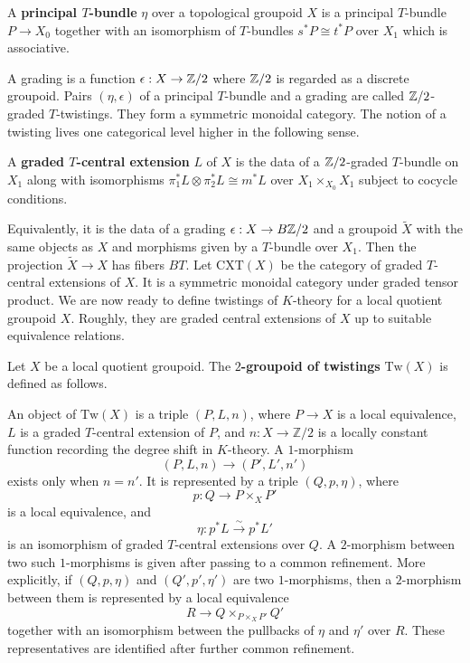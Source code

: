 \documentclass[12pt]{article}
\begin{document}
\begin{definition}
A \textbf{principal $T$-bundle} $\eta$ over a topological groupoid $X$ is a principal $T$-bundle $P\to X_0$ together with an isomorphism of $T$-bundles $s^*P \cong t^*P$ over $X_1$ which is associative.
\end{definition}

A grading is a function $\epsilon:X\to \mathbb{Z}/2$ where $\mathbb{Z}/2$ is regarded as a discrete groupoid. Pairs $(\eta,\epsilon)$ of a principal $T$-bundle and a grading are called $\mathbb{Z}/2$-graded $T$-twistings. They form a symmetric monoidal category. The notion of a twisting lives one categorical level higher in the following sense.

\begin{definition}
    A \textbf{graded $T$-central extension} $L$ of $X$ is the data of a $\mathbb{Z}/2$-graded $T$-bundle on $X_1$ along with isomorphisms $\pi_1^*L \otimes \pi_2^*L \cong m^*L$ over $X_1\times_{X_0} X_1$ subject to cocycle conditions. 
\end{definition}

Equivalently, it is the data of a grading $\epsilon:X\to B\mathbb{Z}/2$ and a groupoid $\widetilde{X}$ with the same objects as $X$ and morphisms given by a $T$-bundle over $X_1$. Then the projection $\widetilde{X}\to X$ has fibers $BT$. Let $\mathrm{CXT}(X)$ be the category of graded $T$-central extensions of $X$. It is a symmetric monoidal category under graded tensor product. We are now ready to define twistings of $K$-theory for a local quotient groupoid $X$. Roughly, they are graded central extensions of $X$ up to suitable equivalence relations. 

\begin{definition}
Let $X$ be a local quotient groupoid. The \textbf{$2$-groupoid of twistings}
$\mathrm{Tw}(X)$ is defined as follows.

An object of $\mathrm{Tw}(X)$ is a triple $(P,L,n)$, where
$P \to X$ is a local equivalence, $L$ is a graded $T$-central extension
of $P$, and $n:X\to \mathbb Z/2$ is a locally constant function recording
the degree shift in $K$-theory. A $1$-morphism
\[
(P,L,n)\longrightarrow (P',L',n')
\]
exists only when $n=n'$. It is represented by a triple $(Q,p,\eta)$, where
\[
p:Q\to P\times_X P'
\]
is a local equivalence, and
\[
\eta:p^*L \xrightarrow{\sim} p^*L'
\]
is an isomorphism of graded $T$-central extensions over $Q$. A $2$-morphism between two such $1$-morphisms is given after passing to
a common refinement. More explicitly, if $(Q,p,\eta)$ and $(Q',p',\eta')$
are two $1$-morphisms, then a $2$-morphism between them is represented by
a local equivalence
\[
R\to Q\times_{P\times_X P'}Q'
\]
together with an isomorphism between the pullbacks of $\eta$ and $\eta'$
over $R$. These representatives are identified after further common
refinement.
\end{definition}
\end{document}
